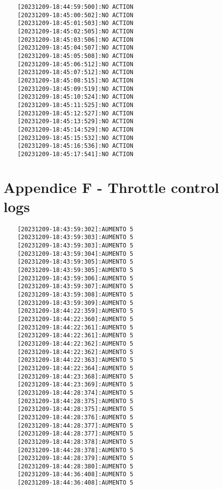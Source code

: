 \documentclass[12pt]{article}
\begin{document}
\begin{verbatim}
    [20231209-18:44:59:500]:NO ACTION
    [20231209-18:45:00:502]:NO ACTION
    [20231209-18:45:01:503]:NO ACTION
    [20231209-18:45:02:505]:NO ACTION
    [20231209-18:45:03:506]:NO ACTION
    [20231209-18:45:04:507]:NO ACTION
    [20231209-18:45:05:508]:NO ACTION
    [20231209-18:45:06:512]:NO ACTION
    [20231209-18:45:07:512]:NO ACTION
    [20231209-18:45:08:515]:NO ACTION
    [20231209-18:45:09:519]:NO ACTION
    [20231209-18:45:10:524]:NO ACTION
    [20231209-18:45:11:525]:NO ACTION
    [20231209-18:45:12:527]:NO ACTION
    [20231209-18:45:13:529]:NO ACTION
    [20231209-18:45:14:529]:NO ACTION
    [20231209-18:45:15:532]:NO ACTION
    [20231209-18:45:16:536]:NO ACTION
    [20231209-18:45:17:541]:NO ACTION
\end{verbatim}

\section{Appendice F - Throttle control logs}
\begin{verbatim}
    [20231209-18:43:59:302]:AUMENTO 5
    [20231209-18:43:59:303]:AUMENTO 5
    [20231209-18:43:59:303]:AUMENTO 5
    [20231209-18:43:59:304]:AUMENTO 5
    [20231209-18:43:59:305]:AUMENTO 5
    [20231209-18:43:59:305]:AUMENTO 5
    [20231209-18:43:59:306]:AUMENTO 5
    [20231209-18:43:59:307]:AUMENTO 5
    [20231209-18:43:59:308]:AUMENTO 5
    [20231209-18:43:59:309]:AUMENTO 5
    [20231209-18:44:22:359]:AUMENTO 5
    [20231209-18:44:22:360]:AUMENTO 5
    [20231209-18:44:22:361]:AUMENTO 5
    [20231209-18:44:22:361]:AUMENTO 5
    [20231209-18:44:22:362]:AUMENTO 5
    [20231209-18:44:22:362]:AUMENTO 5
    [20231209-18:44:22:363]:AUMENTO 5
    [20231209-18:44:22:364]:AUMENTO 5
    [20231209-18:44:23:368]:AUMENTO 5
    [20231209-18:44:23:369]:AUMENTO 5
    [20231209-18:44:28:374]:AUMENTO 5
    [20231209-18:44:28:375]:AUMENTO 5
    [20231209-18:44:28:375]:AUMENTO 5
    [20231209-18:44:28:376]:AUMENTO 5
    [20231209-18:44:28:377]:AUMENTO 5
    [20231209-18:44:28:377]:AUMENTO 5
    [20231209-18:44:28:378]:AUMENTO 5
    [20231209-18:44:28:378]:AUMENTO 5
    [20231209-18:44:28:379]:AUMENTO 5
    [20231209-18:44:28:380]:AUMENTO 5
    [20231209-18:44:36:408]:AUMENTO 5
    [20231209-18:44:36:408]:AUMENTO 5
\end{verbatim}
\end{document}
